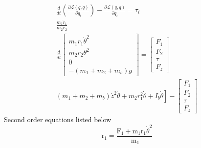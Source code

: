 \documentclass{UoNMCHA}
\numberwithin{equation}{section}
\begin{document}
	$$
	\begin{array}{c}
	\frac{d}{d t}\left(\frac{\partial \mathcal{L}(q, \dot{q})}{\partial \dot{q}_{i}}\right)-\frac{\partial \mathcal{L}(q, \dot{q})}{\partial q_{i}}=\tau_{i} \\
	\frac{m_{1} \dot{r}_{1}}{m_{2} \dot{r}_{2}} \\
	\frac{d}{d t}\left[\begin{array}{c}
	m_{1} r_{1} \dot{\theta}^{2} \\
	m_{2} r_{2} \theta^{2} \\
	0 \\
	-\left(m_{1}+m_{2}+m_{b}\right) g
	\end{array}\right]=\left[\begin{array}{c}
	F_{1} \\
	F_{2} \\
	\tau \\
	F_{z}
	\end{array}\right] \\
	\left.\left(m_{1}+m_{2}+m_{b}\right) \dot{z}^{2} \dot{\theta}+m_{2} r_{1}^{2} \dot{\theta}+I_{b} \dot{\theta}\right]-\left[\begin{array}{c}
	F_{1} \\
	F_{2} \\
	\tau \\
	F_{z}
	\end{array}\right]
	\end{array}
	$$
	Second order equations listed below
	$$
	\ddot{\mathrm{r}}_{1}=\frac{\mathrm{F}_{1}+\mathrm{m}_{1} \mathrm{r}_{1} \dot{\theta}^{2}}{\mathrm{~m}_{1}}
	$$
	
\end{document}
